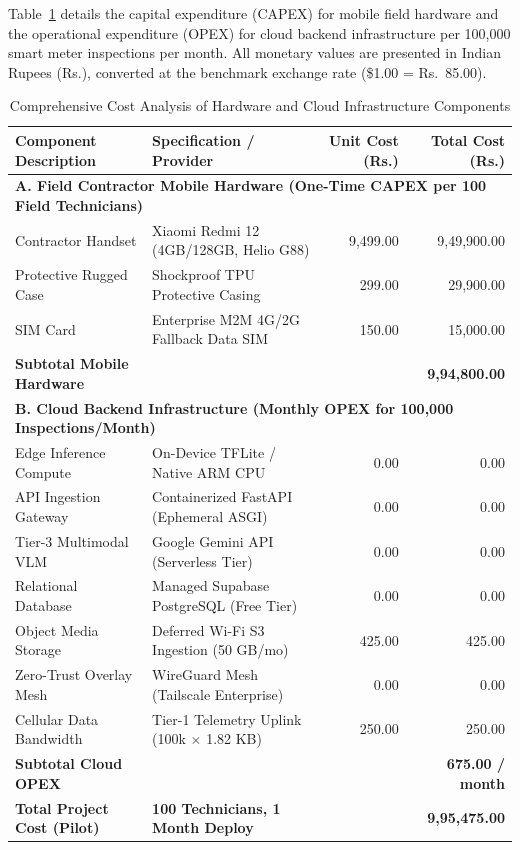 \documentclass[12pt,a4paper,oneside]{report}
\begin{document}
Table~\ref{tab:cost_analysis} details the capital expenditure (CAPEX) for mobile field hardware and the operational expenditure (OPEX) for cloud backend infrastructure per 100,000 smart meter inspections per month. All monetary values are presented in Indian Rupees (Rs.), converted at the benchmark exchange rate (\$1.00 = Rs.~85.00).

\begin{table}[htbp]
\caption{Comprehensive Cost Analysis of Hardware and Cloud Infrastructure Components}
\label{tab:cost_analysis}
\centering
\small
\begin{tabularx}{\textwidth}{lXrr}
\toprule
\textbf{Component Description} & \textbf{Specification / Provider} & \textbf{Unit Cost (Rs.)} & \textbf{Total Cost (Rs.)} \\
\midrule
\multicolumn{4}{l}{\textbf{A. Field Contractor Mobile Hardware (One-Time CAPEX per 100 Field Technicians)}} \\
Contractor Handset & Xiaomi Redmi 12 (4GB/128GB, Helio G88) & 9,499.00 & 9,49,900.00 \\
Protective Rugged Case & Shockproof TPU Protective Casing & 299.00 & 29,900.00 \\
SIM Card & Enterprise M2M 4G/2G Fallback Data SIM & 150.00 & 15,000.00 \\
\midrule
\textbf{Subtotal Mobile Hardware} & & & \textbf{9,94,800.00} \\
\midrule
\multicolumn{4}{l}{\textbf{B. Cloud Backend Infrastructure (Monthly OPEX for 100,000 Inspections/Month)}} \\
Edge Inference Compute & On-Device TFLite / Native ARM CPU & 0.00 & 0.00 \\
API Ingestion Gateway & Containerized FastAPI (Ephemeral ASGI) & 0.00 & 0.00 \\
Tier-3 Multimodal VLM & Google Gemini API (Serverless Tier) & 0.00 & 0.00 \\
Relational Database & Managed Supabase PostgreSQL (Free Tier) & 0.00 & 0.00 \\
Object Media Storage & Deferred Wi-Fi S3 Ingestion (50 GB/mo) & 425.00 & 425.00 \\
Zero-Trust Overlay Mesh & WireGuard Mesh (Tailscale Enterprise) & 0.00 & 0.00 \\
Cellular Data Bandwidth & Tier-1 Telemetry Uplink (100k $\times$ 1.82 KB) & 250.00 & 250.00 \\
\midrule
\textbf{Subtotal Cloud OPEX} & & & \textbf{675.00 / month} \\
\midrule
\textbf{Total Project Cost (Pilot)} & \textbf{100 Technicians, 1 Month Deploy} & & \textbf{9,95,475.00} \\
\bottomrule
\end{tabularx}
\end{table}
\end{document}
